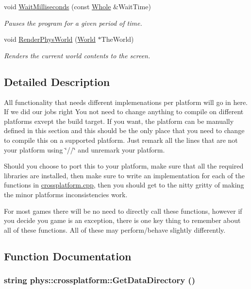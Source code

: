 \begin{DoxyCompactItemize}
void \hyperlink{namespacephys_1_1crossplatform_ab5287fc10a132457a1309e1f5645347a}{WaitMilliseconds} (const \hyperlink{namespacephys_a460f6bc24c8dd347b05e0366ae34f34a}{Whole} \&WaitTime)
\begin{DoxyCompactList}\small\item\em Pauses the program for a given period of time. \item\end{DoxyCompactList}\item 
void \hyperlink{namespacephys_1_1crossplatform_aa80d0a5289b00daad110fd29bf23c5e7}{RenderPhysWorld} (\hyperlink{classphys_1_1World}{World} $\ast$TheWorld)
\begin{DoxyCompactList}\small\item\em Renders the current world contents to the screen. \item\end{DoxyCompactList}\end{DoxyCompactItemize}


\subsection{Detailed Description}
All functionality that needs different implemenations per platform will go in here. If we did our jobs right You not need to change anything to compile on different platforms exvept the build target. If you want, the platform can be manually defined in this section and this should be the only place that you need to change to compile this on a supported platform. Just remark all the lines that are not your platform using \char`\"{}//\char`\"{} and unremark your platform. \par
\par
 Should you choose to port this to your platform, make sure that all the required libraries are installed, then make sure to write an implementation for each of the functions in \hyperlink{crossplatform_8cpp_source}{crossplatform.cpp}, then you should get to the nitty gritty of making the minor platforms inconsistencies work. \par
\par
 For most games there will be no need to directly call these functions, however if you decide you game is an exception, there is one key thing to remember about all of these functions. All of these may perform/behave slightly differently. 

\subsection{Function Documentation}
\hypertarget{namespacephys_1_1crossplatform_ac73c7f2db76ddfeb41723d72decc1366}{
\subsubsection[{GetDataDirectory}]{\setlength{\rightskip}{0pt plus 5cm}string phys::crossplatform::GetDataDirectory ()}}
\label{d4/d59/namespacephys_1_1crossplatform_ac73c7f2db76ddfeb41723d72decc1366}


